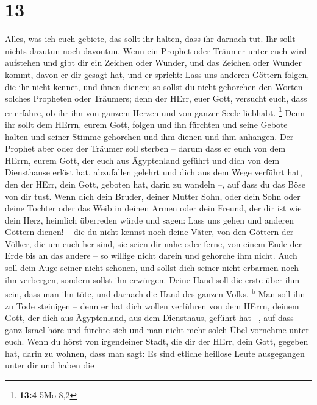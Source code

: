 \hypertarget{section-12}{%
\section{13}\label{section-12}}

 Alles, was ich euch gebiete, das sollt ihr halten, dass
ihr darnach tut. Ihr sollt nichts dazutun noch davontun. 
Wenn ein Prophet oder Träumer unter euch wird aufstehen und gibt dir ein
Zeichen oder Wunder,  und das Zeichen oder Wunder kommt,
davon er dir gesagt hat, und er spricht: Lass uns anderen Göttern
folgen, die ihr nicht kennet, und ihnen dienen;  so sollst
du nicht gehorchen den Worten solches Propheten oder Träumers; denn der
HErr, euer Gott, versucht euch, dass er erfahre, ob ihr ihn von ganzem
Herzen und von ganzer Seele liebhabt. \footnote{\textbf{13:4} 5Mo 8,2}
 Denn ihr sollt dem HErrn, eurem Gott, folgen und ihn
fürchten und seine Gebote halten und seiner Stimme gehorchen und ihm
dienen und ihm anhangen.  Der Prophet aber oder der
Träumer soll sterben -- darum dass er euch von dem HErrn, eurem Gott,
der euch aus Ägyptenland geführt und dich von dem Diensthause erlöst
hat, abzufallen gelehrt und dich aus dem Wege verführt hat, den der
HErr, dein Gott, geboten hat, darin zu wandeln --, auf dass du das Böse
von dir tust.  Wenn dich dein Bruder, deiner Mutter Sohn,
oder dein Sohn oder deine Tochter oder das Weib in deinen Armen oder
dein Freund, der dir ist wie dein Herz, heimlich überreden würde und
sagen: Lass uns gehen und anderen Göttern dienen! -- die du nicht kennst
noch deine Väter,  von den Göttern der Völker, die um euch
her sind, sie seien dir nahe oder ferne, von einem Ende der Erde bis an
das andere --  so willige nicht darein und gehorche ihm
nicht. Auch soll dein Auge seiner nicht schonen, und sollst dich seiner
nicht erbarmen noch ihn verbergen,  sondern sollst ihn
erwürgen. Deine Hand soll die erste über ihm sein, dass man ihn töte,
und darnach die Hand des ganzen Volks. \textsuperscript{b}
 Man soll ihn zu Tode steinigen -- denn er hat dich
wollen verführen von dem HErrn, deinem Gott, der dich aus Ägyptenland,
aus dem Diensthaus, geführt hat --,  auf dass ganz Israel
höre und fürchte sich und man nicht mehr solch Übel vornehme unter euch.
 Wenn du hörst von irgendeiner Stadt, die dir der HErr,
dein Gott, gegeben hat, darin zu wohnen, dass man sagt: 
Es sind etliche heillose Leute ausgegangen unter dir und haben die
